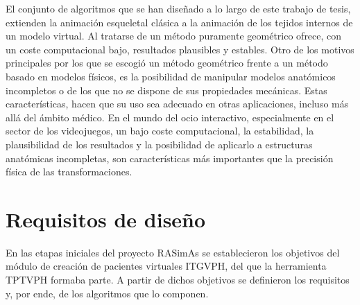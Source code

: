 El conjunto de algoritmos que se han diseñado a lo largo de este trabajo de tesis, extienden la animación esqueletal clásica a la animación de los tejidos internos de un modelo virtual. Al tratarse de un método puramente geométrico ofrece, con un coste computacional bajo, resultados plausibles y estables. Otro de los motivos principales por los que se escogió un método geométrico frente a un método basado en modelos físicos, es la posibilidad de manipular modelos anatómicos incompletos o de los que no se dispone de sus propiedades mecánicas. Estas características, hacen que su uso sea adecuado en otras aplicaciones, incluso más allá del ámbito médico.  En el mundo del ocio interactivo, especialmente en el sector de los videojuegos, un bajo coste computacional, la estabilidad, la plausibilidad de los resultados y la posibilidad de aplicarlo a estructuras anatómicas incompletas, son características más importantes que la precisión física de las transformaciones. 


\section{Requisitos de diseño}
\label{posing:req}

En las etapas iniciales del proyecto \ac{RASimAs} se establecieron los objetivos del módulo de creación de pacientes virtuales \ac{ITGVPH}, del que la herramienta \ac{TPTVPH} formaba parte. A partir de dichos objetivos se definieron los requisitos y, por ende, de los algoritmos que lo componen.



